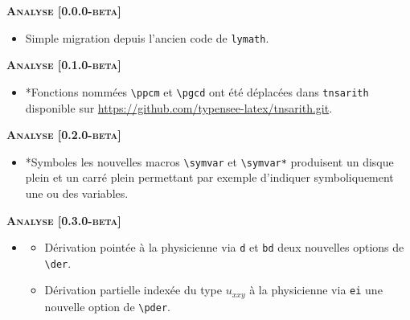 \documentclass[12pt,a4paper]{book}
\makeatletter
\newcommand\env[1]{\texttt{#1}}
\newcommand\macro[1]{\env{\textbackslash{}#1}}
\theoremstyle{definition}
\newcommand\topic{\@ifstar{\@topic@star}{\@topic@no@star}}
\newcommand\@topic@no@star[1]{%
	\textbf{\textsc{#1}.}%
}
\newcommand\@topic@star[1]{%
	\textbf{\textsc{#1} :}%
}
\makeatother
\begin{document}
{{\begin{description}
    
    \begin{center}
        \textbf{\textsc{Analyse [0.0.0-beta]}}
    \end{center}
    
    \begin{itemize}[itemsep=.5em]
        \item Simple migration depuis l'ancien code de \verb+lymath+.
    \end{itemize}
    
    
    \begin{center}
        \textbf{\textsc{Analyse [0.1.0-beta]}}
    \end{center}
    
    \begin{itemize}[itemsep=.5em]
        \item \topic*{Fonctions nommées} \macro{ppcm} et \macro{pgcd} ont été déplacées dans \texttt{tnsarith} disponible sur \url{https://github.com/typensee-latex/tnsarith.git}.
    \end{itemize}
    
    
    \begin{center}
        \textbf{\textsc{Analyse [0.2.0-beta]}}
    \end{center}
    
    \begin{itemize}[itemsep=.5em]
        \item \topic*{Symboles} les nouvelles macros \macro{symvar} et \macro{symvar*} produisent un disque plein et un carré plein permettant par exemple d'indiquer symboliquement une ou des variables.
        
        
    \end{itemize}
    
    
    \begin{center}
        \textbf{\textsc{Analyse [0.3.0-beta]}}
    \end{center}
    
    \begin{itemize}[itemsep=.5em]
        \item \topic{Dérivation}
        \begin{itemize}[itemsep=.5em]
            \item Dérivation pointée à la physicienne via \verb+d+ et \verb+bd+ deux nouvelles options de \macro{der}.
    
            \item Dérivation partielle indexée du type $u_{xxy}$ à la physicienne via \verb+ei+ une nouvelle option de \macro{pder}.
        \end{itemize}
    

\end{itemize}
\end{description}}}
\end{document}
